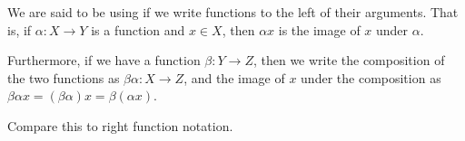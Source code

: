 \documentclass[12pt]{article}
\begin{document}
We are said to be using {}
if we write functions to the left of their arguments.
That is, if $\alpha : X \to Y$ is a function and $x \in X$,
then $\alpha x$ is the image of $x$ under $\alpha$.

Furthermore, if we have a function $\beta : Y \to Z$,
then we write the composition of the two functions
as $\beta \alpha : X \to Z$,
and the image of $x$ under the composition
as $\beta \alpha x = (\beta \alpha) x = \beta(\alpha x)$.

Compare this to right function notation.
\end{document}
